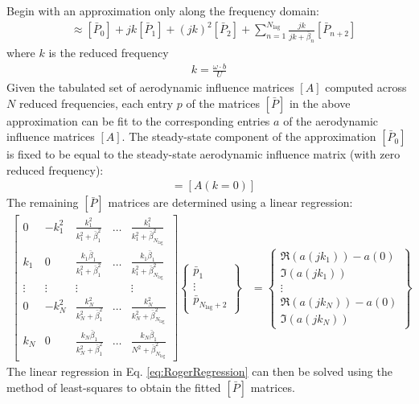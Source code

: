 Begin with an approximation only along the frequency domain:
\begin{align}
    [A(jk)] &\approx [\bar{P}_0] + jk [\bar{P}_1] + (jk)^2 [\bar{P}_2] + \sum_{n=1}^{N_\text{lag}} \frac{jk}{jk+\bar{\beta}_n} [\bar{P}_{n+2}]
\end{align}
where $k$ is the reduced frequency
\begin{align}
	k = \frac{\omega \cdot b}{U}
\end{align}
Given the tabulated set of aerodynamic influence matrices $[A]$ computed across $N$ reduced frequencies, each entry $p$ of the matrices $[\bar{P}]$ in the above approximation can be fit to the corresponding entries $a$ of the aerodynamic influence matrices $[A]$. The steady-state component of the approximation $[\bar{P}_0]$ is fixed to be equal to the steady-state aerodynamic influence matrix (with zero reduced frequency):
\begin{align}
    [\bar{P}_0] &= [A(k=0)]
\end{align}
The remaining $[\bar{P}]$ matrices are determined using a linear regression:
\begin{align}
	\label{eq:RogerRegression}
    \begin{bmatrix}
        0 & -k_1^2 & \frac{k_1^2}{k_1^2 + \bar{\beta}_1^2} & \dots & \frac{k_1^2}{k_1^2 + \bar{\beta}_{N_\text{lag}}^2} \\
	    k_1 & 0 & \frac{k_1 \bar{\beta}_1}{k_1^2 + \bar{\beta}_1^2} & \dots & \frac{k_1 \bar{\beta}_1}{k_1^2 + \bar{\beta}_{N_\text{lag}}^2} \\
	    \vdots & \vdots & \vdots & & \vdots \\
        0 & -k_N^2 & \frac{k_N^2}{k_N^2 + \bar{\beta}_1^2} & \dots & \frac{k_N^2}{k_N^2 + \bar{\beta}_{N_\text{lag}}^2} \\
	    k_N & 0 & \frac{k_N \bar{\beta}_1}{k_N^2 + \bar{\beta}_1^2} & \dots & \frac{k_N \bar{\beta}_1}{N^2 + \bar{\beta}_{N_\text{lag}}^2}	    
    \end{bmatrix}
    \begin{Bmatrix} \bar{p}_1 \\ \vdots \\ \bar{p}_{N_\text{lag}+2} \end{Bmatrix}
    &=
    \begin{Bmatrix}
	    \Re(a(jk_1)) - a(0) \\
	    \Im(a(jk_1)) \\
	    \vdots \\
	    \Re(a(jk_N)) - a(0) \\
	    \Im(a(jk_N))	    
    \end{Bmatrix}
\end{align}
The linear regression in Eq. \ref{eq:RogerRegression} can then be solved using the method of least-squares to obtain the fitted $[\bar{P}]$ matrices.

